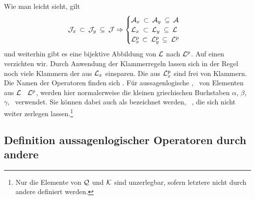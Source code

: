 Wie man leicht sieht, gilt
\begin{equation}
	\mathcal{J}_x      \: \subset \: \mathcal{J}_y  \: \subseteq \: \mathcal{J} \Rightarrow
	\begin{cases}
		\mathcal{A}_x  \: \subset \: \mathcal{A}_y  \: \subseteq \: \mathcal{A} \\
		\mathcal{L}_x  \; \subset \: \mathcal{L}_y  \; \subseteq \: \mathcal{L} \\
		\mathcal{L}^\mathrm{p}_x \, \subset \: \mathcal{L}^\mathrm{p}_y \, \subseteq \: \mathcal{L}^\mathrm{p}
	\end{cases}
\end{equation}
und weiterhin gibt es eine bijektive Abbildung von $\mathcal{L}$ nach $\mathcal{L}^\mathrm{p}$. Auf einen  verzichten wir.
%
Durch Anwendung der Klammerregeln  lassen sich in der Regel noch viele Klammern der  aus $\mathcal{L}_x$ einsparen.
Die  aus $\mathcal{L}^\mathrm{p}_x$ sind frei von Klammern.
Die Namen der Operatoren finden sich .
Für aussagenlogische , \textdh\ von Elementen aus $\mathcal{L}$ \textbzgl\ $\mathcal{L}^\mathrm{p}$, werden hier normalerweise die kleinen griechischen Buchstaben $\alpha$, $\beta$, $\gamma$, \textusw\ verwendet.
Sie können dabei auch als \emph{} bezeichnet werden, \textdh\ , die sich nicht weiter zerlegen lassen.\footnote{%
	Nur die Elemente von $\mathcal{Q}$ und $\mathcal{K}$ sind unzerlegbar, sofern letztere nicht durch andere  definiert werden.%
}

\subsection{Definition aussagenlogischer Operatoren durch andere}%
\label{sub:ausOperatorDef}


